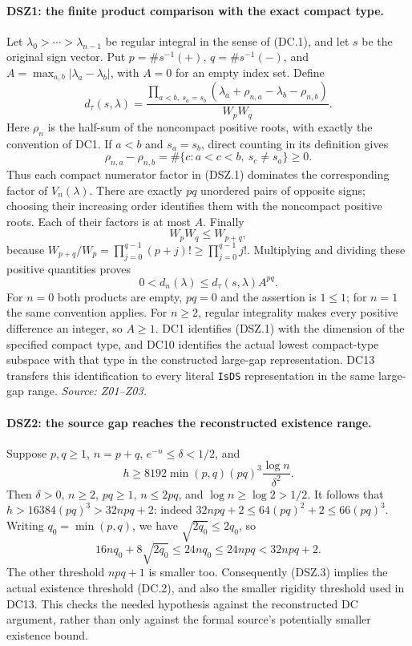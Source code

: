 \paragraph{DSZ1: the finite product comparison with the exact compact type.}
\label{claim:DSZ1}
Let $\lambda_0>\cdots>\lambda_{n-1}$ be regular integral in the sense
of (DC.1), and let $s$ be the original sign vector. Put
$p=\#s^{-1}(+)$, $q=\#s^{-1}(-)$, and
$A=\max_{a,b}|\lambda_a-\lambda_b|$, with $A=0$ for an empty
index set. Define
\[
 d_\tau(s,\lambda)=
 \frac{\displaystyle\prod_{a<b,\ s_a=s_b}
       (\lambda_a+\rho_{n,a}-\lambda_b-\rho_{n,b})}{W_pW_q}.
                                                               \tag{DSZ.1}
\]
Here $\rho_n$ is the half-sum of the noncompact positive roots,
with exactly the convention of DC1. If $a<b$ and $s_a=s_b$, direct
counting in its definition gives
\[
 \rho_{n,a}-\rho_{n,b}
       =\#\{c:a<c<b,\ s_c\ne s_a\}\ge0.
\]
Thus each compact numerator factor in (DSZ.1) dominates the
corresponding factor of $V_n(\lambda)$. There are exactly $pq$
unordered pairs of opposite signs; choosing their increasing order
identifies them with the noncompact positive roots. Each of their
factors is at most $A$. Finally
\[
 W_pW_q\le W_{p+q},
\]
because $W_{p+q}/W_p=\prod_{j=0}^{q-1}(p+j)!\ge\prod_{j=0}^{q-1}j!$.
Multiplying and dividing these positive quantities proves
\[
             0<d_n(\lambda)\le d_\tau(s,\lambda)A^{pq}.
                                                               \tag{DSZ.2}
\]
For $n=0$ both products are empty, $p q=0$ and the assertion is
$1\le1$; for $n=1$ the same convention applies. For $n\ge2$,
regular integrality makes every positive difference an integer,
so $A\ge1$. DC1 identifies (DSZ.1) with the dimension of the
specified compact type, and DC10 identifies the actual lowest
compact-type subspace with that type in the constructed large-gap
representation. DC13 transfers this identification to every literal
\texttt{IsDS} representation in the same large-gap range.
\emph{Source: Z01--Z03.}

\paragraph{DSZ2: the source gap reaches the reconstructed existence range.}
\label{claim:DSZ2}
Suppose $p,q\ge1$, $n=p+q$, $e^{-n}\le\delta<1/2$, and
\[
 h\ge8192\min(p,q)(pq)^3\frac{\log n}{\delta^2}.
                                                               \tag{DSZ.3}
\]
Then $\delta>0$, $n\ge2$, $pq\ge1$, $n\le2pq$, and
$\log n\ge\log2>1/2$. It follows that
$h>16384(pq)^3>32npq+2$: indeed
$32npq+2\le64(pq)^2+2\le66(pq)^3$.
Writing $q_0=\min(p,q)$, we have
$\sqrt{2q_0}\le2q_0$, so
\[
 16nq_0+8\sqrt{2q_0}\le24nq_0\le24npq<32npq+2.
\]
The other threshold $npq+1$ is smaller too. Consequently (DSZ.3)
implies the actual existence threshold (DC.2), and also the smaller
rigidity threshold used in DC13. This checks the needed hypothesis
against the reconstructed DC argument, rather than only against the
formal source's potentially smaller existence bound.

